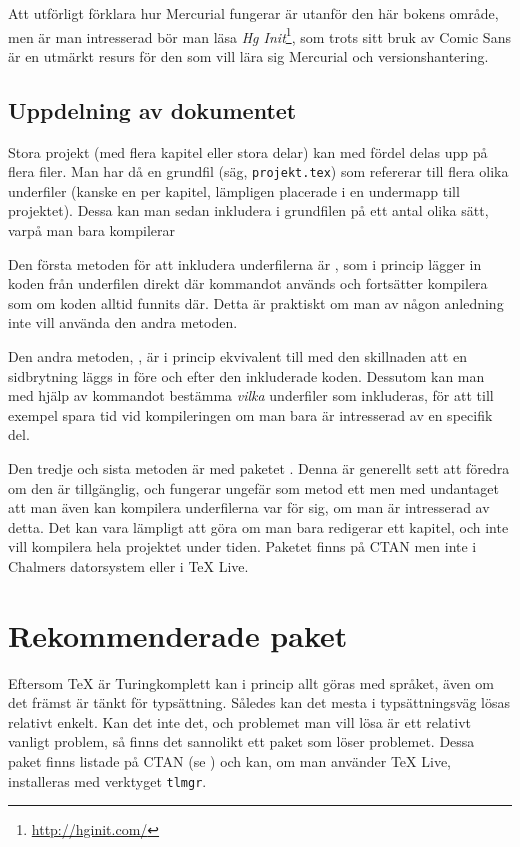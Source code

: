 \documentclass[10pt,../../a4.tex]{subfiles}
\begin{document}
Att utförligt förklara hur Mercurial fungerar är utanför den här bokens
område, men är man intresserad bör man läsa
\emph{Hg Init}\footnote{\url{http://hginit.com/}}, som trots sitt bruk av
Comic Sans är en utmärkt resurs för den som vill lära sig Mercurial och
versionshantering.

\subsection{Uppdelning av dokumentet}
Stora projekt (med flera kapitel eller stora delar) kan med fördel delas
upp på flera filer. Man har då en grundfil (säg, \texttt{projekt.tex}) som
refererar till flera olika underfiler (kanske en per kapitel, lämpligen
placerade i en undermapp till projektet). Dessa kan man sedan inkludera
i grundfilen på ett antal olika sätt, varpå man bara kompilerar

Den första metoden för att inkludera underfilerna är , som i
princip lägger in koden från underfilen direkt där kommandot används och
fortsätter kompilera som om koden alltid funnits där. Detta är praktiskt
om man av någon anledning inte vill använda den andra metoden.

Den andra metoden, , är i princip ekvivalent till 
med den skillnaden att en sidbrytning läggs in före och efter den 
inkluderade koden. Dessutom kan man med hjälp av kommandot
 bestämma \emph{vilka} underfiler som inkluderas, för att
till exempel spara tid vid kompileringen om man bara är intresserad av en
specifik del.

Den tredje och sista metoden är med paketet . Denna är
generellt sett att föredra om den är tillgänglig, och fungerar ungefär som
metod ett men med undantaget att man även kan kompilera underfilerna
var för sig, om man är intresserad av detta. Det kan vara lämpligt att
göra om man bara redigerar ett kapitel, och inte vill kompilera hela
projektet under tiden. Paketet  finns på CTAN men inte i
Chalmers datorsystem eller i \TeX{} Live.

\section{Rekommenderade paket}
Eftersom \TeX{} är Turingkomplett kan i princip allt göras med språket,
även om det främst är tänkt för typsättning. Således kan det mesta i 
typsättningsväg lösas relativt enkelt. Kan det inte det, och problemet
man vill lösa är ett relativt vanligt problem, så finns det sannolikt ett
paket som löser problemet. Dessa paket finns listade på CTAN (se
) och kan, om man använder \TeX{} Live, installeras
med verktyget \texttt{tlmgr}.
\end{document}
